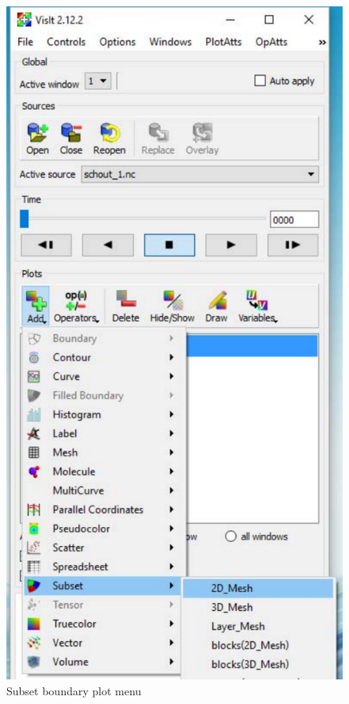 \documentclass[12pt]{report}
\begin{document}
\begin{figure}
\begin{center}
\includegraphics{subsetBoundaryMenu}
\caption{Subset boundary plot menu}
\label{figure:subsetBounaryMenu}
\end{center}
\end{figure} 
\end{document}
